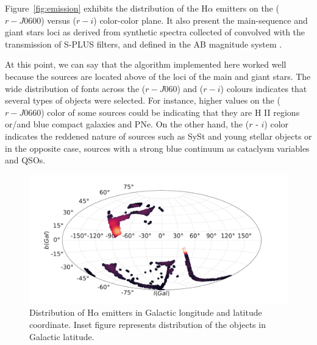 \documentclass[fleqn,usenatbib]{mnras}
\begin{document}
Figure~\ref{fig:emission} exhibits the distribution of the H{$\alpha$} emitters on the
($r - J0600$) versus ($r - i$) color-color plane. 
It also present the main-sequence and giant stars loci as derived from synthetic spectra collected of \citet{Pickles:1998} convolved with the transmission of S-PLUS filters, 
and defined in the AB magnitude system \citep{Oke:1983}.

At this point, we can say that
the algorithm implemented here worked well because the sources
are located  above of the loci of the main and giant stars. The wide distribution of fonts across
the ($r - J060$) and ($r - i$) colours indicates that several types of objects were selected.
For instance, higher values on the  ($r - J0660$) color of some sources could be indicating
that they are H II regions or/and blue compact galaxies and PNe. On the other hand, the 
($r$ - $i$) color indicates the  reddened nature of sources such as SySt and young stellar objects
or in the opposite case, sources with a strong blue continuum as cataclysm variables and QSOs.

\begin{figure}
\includegraphics[width=0.9\linewidth]{Figs/halpha-emitters-galactic-aitoff.pdf}
\centering
{}
\caption{Distribution of H{$\alpha$} emitters in Galactic longitude and latitude
  coordinate. Inset figure represents distribution of the objects in Galactic latitude.}
\label{fig:aitoff-distribution}
\end{figure}
\end{document}
